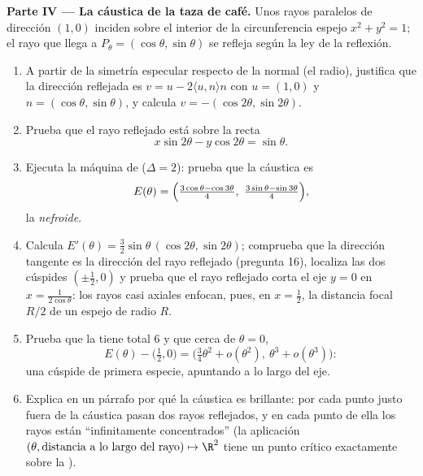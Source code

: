 \begin{problem}
\medskip
\noindent\textbf{Parte IV --- La cáustica de la taza de café.} Unos
rayos paralelos de dirección $(1, 0)$ inciden sobre el interior de la
circunferencia espejo $x^2 + y^2 = 1$; el rayo que llega a $P_\theta
= (\cos\theta, \sin\theta)$ se refleja según la ley de la reflexión.
\begin{enumerate}[resume]
  \item A partir de la simetría especular respecto de la normal (el
        radio), justifica que la dirección reflejada es $v = u -
        2\langle u, n\rangle n$ con $u = (1,0)$ y $n = (\cos\theta,
        \sin\theta)$, y calcula $v = -(\cos2\theta, \sin2\theta)$.
  \item Prueba que el rayo reflejado está sobre la recta
        \[
        x\sin 2\theta - y\cos 2\theta = \sin\theta .
        \]
  \item Ejecuta la máquina de  ($\Delta = 2$): prueba que
        la cáustica es
        \[
        E(\theta) = \Bigl(\tfrac{3\cos\theta -
        \cos3\theta}4,\ \tfrac{3\sin\theta -
        \sin3\theta}4\Bigr),
        \]
        la \emph{nefroide}.
  \item Calcula $E'(\theta) = \tfrac32\sin\theta\, (\cos2\theta,
        \sin2\theta)$; comprueba que la dirección tangente es la
        dirección del rayo reflejado (pregunta 16), localiza las dos
        cúspides $(\pm\tfrac12, 0)$ y prueba que el rayo reflejado
        corta el eje $y = 0$ en $x = \frac1{2\cos\theta}$: los rayos
        casi axiales enfocan, pues, en $x = \tfrac12$, la distancia
        focal $R/2$ de un espejo de radio $R$.
  \item Prueba que la  tiene  total $6$ y que cerca
        de $\theta = 0$,
        \[
        E(\theta) - \bigl(\tfrac12, 0\bigr) =
        \bigl(\tfrac34\theta^2 + o(\theta^2),\ \theta^3 +
        o(\theta^3)\bigr) :
        \]
        una cúspide de primera especie, apuntando a lo largo del
        eje.
  \item Explica en un párrafo por qué la cáustica es brillante: por
        cada punto justo fuera de la cáustica pasan dos rayos
        reflejados, y en cada punto de ella los rayos están
        ``infinitamente concentrados'' (la aplicación $(\theta,
        \text{distancia a lo largo del rayo}) \mapsto \R^2$ tiene un
        punto crítico exactamente sobre la ).
\end{enumerate}


\end{problem}
